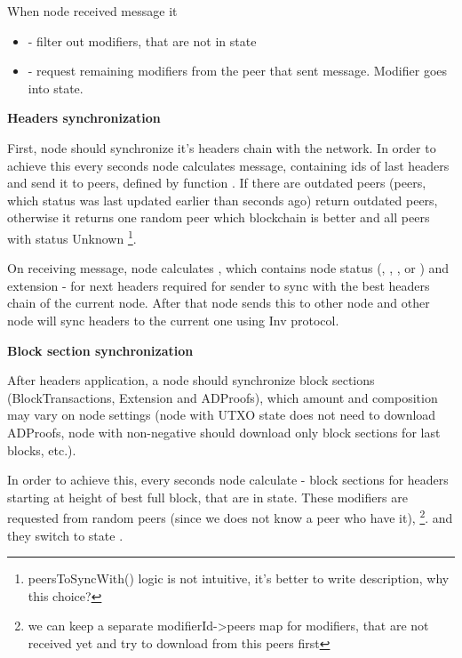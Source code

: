 When node received  message it
\begin{itemize}
    \item - filter out modifiers, that are not in state 
    \item - request remaining modifiers from the peer that sent  message.
    Modifier goes into  state.
\end{itemize}

\textbf{Headers synchronization}

First, node should synchronize it's headers chain with the network.
In order to achieve this every  seconds node calculates  message,
containing ids of last  headers and send it to peers,
defined by function .
If there are outdated peers (peers, which status
was last updated earlier than  seconds ago)  return outdated peers,
otherwise it returns one random peer which blockchain is better and all peers with status Unknown
\footnote{peersToSyncWith() logic is not intuitive, it's better to write description, why this choice?}.

On receiving  message, node calculates ,
which contains node status (, , ,  or ) and extension -
 for next  headers required for  sender to sync with the best headers
chain of the current node.
After that node sends this  to other node and other node will sync headers to the current one
using Inv protocol.

\textbf{Block section synchronization}

After headers application, a node should synchronize block sections
(BlockTransactions, Extension and ADProofs), which amount and composition
may vary on node settings (node with UTXO state does not need to download ADProofs,
node with non-negative 
should download only block sections for last  blocks, etc.).

In order to achieve this, every  seconds node calculate  -
block sections for headers starting at height of best full block, that are in  state.
These modifiers are requested from random peers (since we does not know a peer who have it),
\footnote{we can keep a separate modifierId->peers map for modifiers, that are not received yet and try to download from this peers first}.
and they switch to state .

